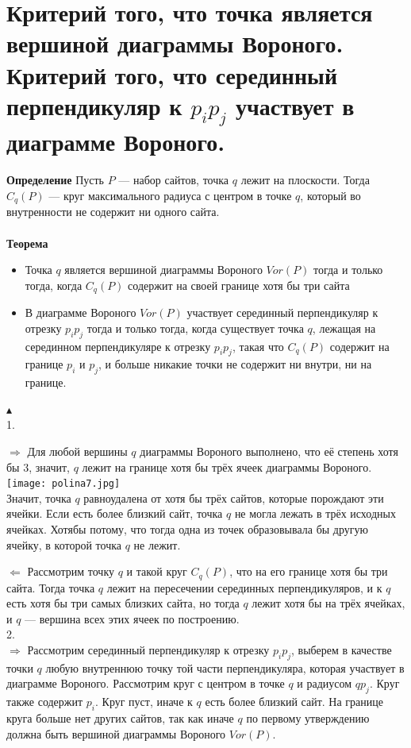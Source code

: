 \section{Критерий того, что точка является вершиной диаграммы Вороного. Критерий того, что серединный перпендикуляр к $p_ip_j$ участвует в диаграмме Вороного.}
\textbf{Определение} Пусть $P$ — набор сайтов, точка $q$ лежит на плоскости. Тогда $C_q(P)$ — круг максимального радиуса с центром в точке $q$, который во внутренности не содержит ни одного сайта.
\\
\\
\textbf{Теорема} \\
\begin{itemize}
    \item Точка $q$ является вершиной диаграммы Вороного $Vor(P)$ тогда и только тогда, когда $C_q (P)$ содержит на своей границе хотя бы три сайта
    \item В диаграмме Вороного $Vor (P)$ участвует серединный перпендикуляр к отрезку $p_i p_j$ тогда и только тогда, когда существует точка $q$, лежащая на серединном перпендикуляре к отрезку $p_i p_j$,  такая что $C_q (P)$ содержит на границе $p_i$ и $p_j$, и больше никакие точки не содержит ни внутри, ни на границе.
\end{itemize}
$\blacktriangle$\\
1.

$\Longrightarrow$ Для любой вершины $q$ диаграммы Вороного выполнено, что её степень хотя бы $3$, значит, $q$ лежит на границе хотя бы трёх ячеек диаграммы Вороного. 
\\
\texttt{[image: polina7.jpg]}
\\
Значит, точка $q$ равноудалена от хотя бы трёх сайтов, которые порождают эти ячейки. Если есть более близкий сайт, точка $q$ не могла лежать в трёх исходных ячейках. Хотябы потому, что тогда одна из точек образовывала бы другую ячейку, в которой точка $q$ не лежит.

$\Longleftarrow$ Рассмотрим точку $q$ и такой круг $C_q (P)$, что на его границе хотя бы три сайта. Тогда точка $q$ лежит на пересечении серединных перпендикуляров, и к $q$ есть хотя бы три самых близких сайта, но тогда $q$ лежит хотя бы на трёх ячейках, и $q$ — вершина всех этих ячеек по построению. \\
2.
\\
$\Longrightarrow$ Рассмотрим серединный перпендикуляр к отрезку $p_i p_j$, выберем в качестве точки $q$ любую внутреннюю точку той части перпендикуляра, которая участвует в диаграмме Вороного. Рассмотрим круг с центром в точке $q$ и радиусом $q p_j$. Круг также содержит $p_i$. Круг пуст, иначе к $q$ есть более близкий сайт. На границе круга больше нет других сайтов, так как иначе $q$ по первому утверждению должна быть вершиной диаграммы Вороного $Vor (P)$.

